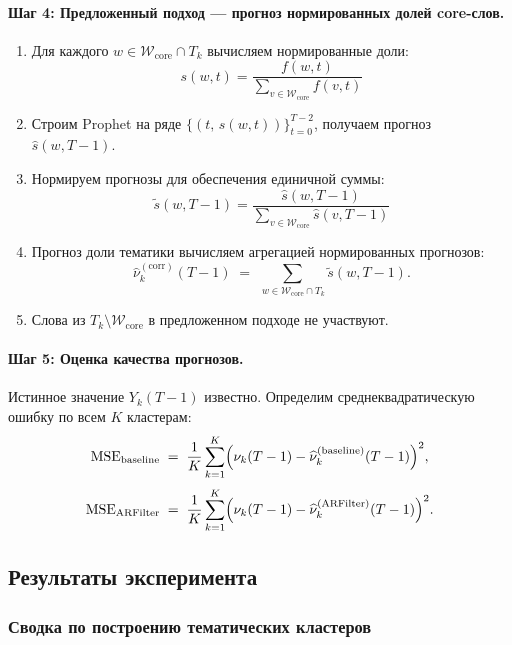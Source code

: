 \documentclass[14pt,a4paper]{article}
\begin{document}
\paragraph{Шаг 4: Предложенный подход — прогноз нормированных долей core-слов.}

\begin{enumerate}
  \item Для каждого \(w\in\mathcal{W}_{\mathrm{core}} \cap T_k\) вычисляем нормированные доли:
  \[s(w,t) = \frac{f(w,t)}{\sum_{v\in\mathcal{W}_{\mathrm{core}}}f(v,t)}\]
  \item Строим Prophet на ряде \(\{(t,\,s(w,t))\}_{t=0}^{T-2}\), получаем прогноз \(\widehat{s}(w,T-1)\).
  \item Нормируем прогнозы для обеспечения единичной суммы:
  \[
    \widetilde{s}(w,T-1) = \frac{\widehat{s}(w,T-1)}{\sum_{v \in \mathcal{W}_{\mathrm{core}}} \widehat{s}(v,T-1)}
  \]
  \item Прогноз доли тематики вычисляем агрегацией нормированных прогнозов:
  \[
    \widehat{\nu}_k^{(\mathrm{corr})}(T-1)
    \;=\;
    \sum_{\,w\in\mathcal{W}_{\mathrm{core}} \cap T_k} \widetilde{s}(w,T-1).
  \]
  \item Слова из \(T_k \setminus \mathcal{W}_{\mathrm{core}}\) в предложенном подходе не участвуют.
\end{enumerate}

\paragraph{Шаг 5: Оценка качества прогнозов.}

Истинное значение \(Y_k(T-1)\) известно. Определим среднеквадратическую ошибку по всем \(K\) кластерам:
\[
  \mathrm{MSE}_{\mathrm{baseline}}
  \;=\; 
  \frac{1}{K}\sum_{k=1}^K 
    \Bigl(\nu_k(T-1) - \widehat{\nu}_k^{(\mathrm{baseline})}(T-1)\Bigr)^2,
\]
\[
  \mathrm{MSE}_{\mathrm{ARFilter}}
  \;=\;
  \frac{1}{K}\sum_{k=1}^K 
    \Bigl(\nu_k(T-1) - \widehat{\nu}_k^{(\mathrm{ARFilter})}(T-1)\Bigr)^2.
\]








\subsection{Результаты эксперимента}

\subsubsection{Сводка по построению тематических кластеров}
\end{document}
